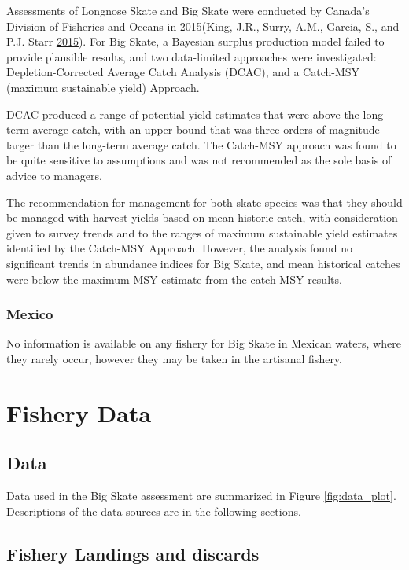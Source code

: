 \documentclass[12pt,]{article}
\begin{document}
Assessments of Longnose Skate and Big Skate were conducted by Canada's
Division of Fisheries and Oceans in 2015(King, J.R., Surry, A.M.,
Garcia, S., and P.J. Starr \protect\hyperlink{ref-King2015}{2015}). For
Big Skate, a Bayesian surplus production model failed to provide
plausible results, and two data-limited approaches were investigated:
Depletion-Corrected Average Catch Analysis (DCAC), and a Catch-MSY
(maximum sustainable yield) Approach.

DCAC produced a range of potential yield estimates that were above the
long-term average catch, with an upper bound that was three orders of
magnitude larger than the long-term average catch. The Catch-MSY
approach was found to be quite sensitive to assumptions and was not
recommended as the sole basis of advice to managers.

The recommendation for management for both skate species was that they
should be managed with harvest yields based on mean historic catch, with
consideration given to survey trends and to the ranges of maximum
sustainable yield estimates identified by the Catch-MSY Approach.
However, the analysis found no significant trends in abundance indices
for Big Skate, and mean historical catches were below the maximum MSY
estimate from the catch-MSY results.

\hypertarget{mexico}{%
\subsubsection{Mexico}\label{mexico}}

No information is available on any fishery for Big Skate in Mexican
waters, where they rarely occur, however they may be taken in the
artisanal fishery.

\newpage

\hypertarget{fishery-data}{%
\section{Fishery Data}\label{fishery-data}}

\hypertarget{data}{%
\subsection{Data}\label{data}}

Data used in the Big Skate assessment are summarized in Figure
\ref{fig:data_plot}. Descriptions of the data sources are in the
following sections.

\hypertarget{fishery-landings-and-discards}{%
\subsection{Fishery Landings and
discards}\label{fishery-landings-and-discards}}
\end{document}
